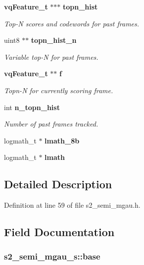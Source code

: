 \begin{DoxyCompactItemize}
\item 
{\bf vq\+Feature\+\_\+t} $\ast$$\ast$$\ast$ {\bf topn\+\_\+hist}
\begin{DoxyCompactList}\small\item\em Top-\/\+N scores and codewords for past frames. \end{DoxyCompactList}\item 
uint8 $\ast$$\ast$ {\bf topn\+\_\+hist\+\_\+n}
\begin{DoxyCompactList}\small\item\em Variable top-\/\+N for past frames. \end{DoxyCompactList}\item 
{\bf vq\+Feature\+\_\+t} $\ast$$\ast$ {\bf f}
\begin{DoxyCompactList}\small\item\em Topn-\/\+N for currently scoring frame. \end{DoxyCompactList}\item 
int {\bf n\+\_\+topn\+\_\+hist}
\begin{DoxyCompactList}\small\item\em Number of past frames tracked. \end{DoxyCompactList}\item 
logmath\+\_\+t $\ast$ {\bfseries lmath\+\_\+8b}\label{structs2__semi__mgau__s_a1900c90c8ab30d38288fb26b402eb325}

\item 
logmath\+\_\+t $\ast$ {\bfseries lmath}\label{structs2__semi__mgau__s_a8f8f7c72297132fb9a939c9981562ae6}

\end{DoxyCompactItemize}


\subsection{Detailed Description}


Definition at line 59 of file s2\+\_\+semi\+\_\+mgau.\+h.



\subsection{Field Documentation}
\subsubsection[{base}]{ s2\+\_\+semi\+\_\+mgau\+\_\+s\+::base}\label{structs2__semi__mgau__s_a9002aae86249006f0b045e5203ec9687}



